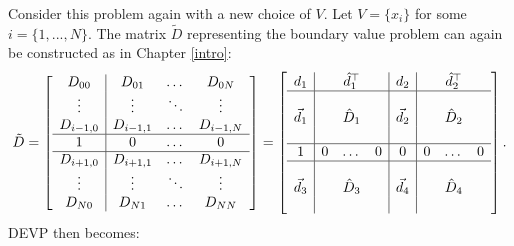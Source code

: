 \documentclass{sfuthesis}
\begin{document}
Consider this problem again with a new choice of $V$.
Let $V = \{ x_i \}$ for some $i = \{1,...,N\}$.
The matrix $\tilde{D}$ representing the boundary value problem can again be constructed as in Chapter \ref{intro}:
\begin{equation}
\tilde{D} = \left [ \begin{array}{c | c c c} D_{00} & D_{01} & \dots & D_{0N} \\
\vdots & \vdots & \ddots & \vdots \\
D_{i-1,0} & D_{i-1,1} & \dots & D_{i-1,N} \\ \hline
1 & 0 & \dots & 0 \\ \hline
D_{i+1,0} & D_{i+1,1} & \dots & D_{i+1,N} \\
\vdots & \vdots & \ddots & \vdots \\
D_{N0} & D_{N1} & \dots & D_{NN} \end{array} \right ] =
\left [ \begin{array}{c | c c c | c | c c c} 
d_1 & & \hat{d}_1^\top & & d_2 & & \hat{d}_2^\top & \\ \hline
& & & & & & & \\
\vec{d}_1 & & \hat{D}_1 & & \vec{d}_2 & & \hat{D}_2 & \\ 
& & & & & & & \\ \hline
1 & 0 & \dots & 0 & 0 & 0 & \dots & 0 \\ \hline
& & & & & & & \\
\vec{d}_3 & & \hat{D}_3 & & \vec{d}_4 & & \hat{D}_4 & \\
& & & & & & & \end{array} \right ] .
\end{equation}
DEVP then becomes:
\end{document}
